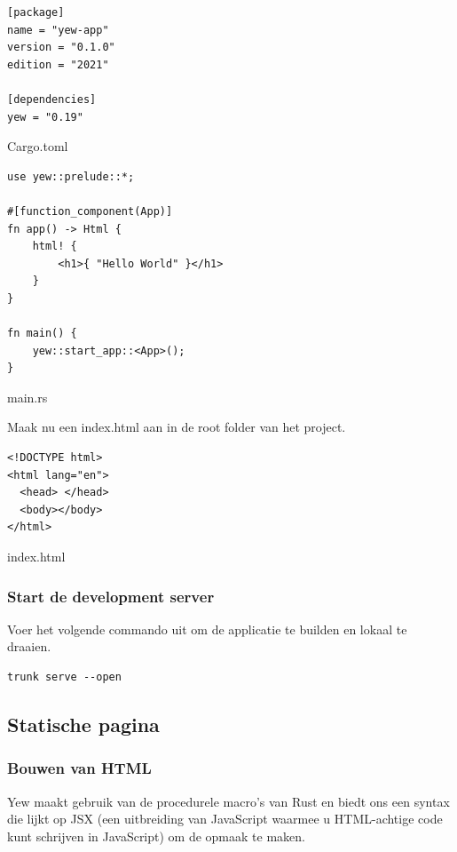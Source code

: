 \begin{listing}[h]
\begin{verbatim}
[package]
name = "yew-app"
version = "0.1.0"
edition = "2021"

[dependencies]
yew = "0.19"
\end{verbatim}
\caption{Cargo.toml}
\end{listing}

\clearpage

\begin{listing}[h]
\begin{verbatim}
use yew::prelude::*;

#[function_component(App)]
fn app() -> Html {
    html! {
        <h1>{ "Hello World" }</h1>
    }
}

fn main() {
    yew::start_app::<App>();
}
\end{verbatim}
\caption{main.rs}
\end{listing}

Maak nu een index.html aan in de root folder van het project.

\begin{listing}[h]
\begin{verbatim}
<!DOCTYPE html>
<html lang="en">
  <head> </head>
  <body></body>
</html>
\end{verbatim}
\caption{index.html}
\end{listing}

\subsubsection{Start de development server}

Voer het volgende commando uit om de applicatie te builden en lokaal te draaien.

\begin{verbatim}
trunk serve --open
\end{verbatim}

\subsection{Statische pagina}

\subsubsection{Bouwen van HTML}

Yew maakt gebruik van de procedurele macro's van Rust en biedt ons een syntax die lijkt op JSX (een
uitbreiding van JavaScript waarmee u HTML-achtige code kunt schrijven in JavaScript) om de opmaak te
maken.

